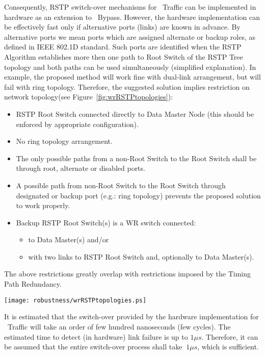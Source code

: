 Consequently, RSTP switch-over mechanisms for \HP\ Traffic can be
implemented in hardware as an extension to \HP\ Bypass. However, the hardware
implementation can be effectively fast only if alternative ports (links) are
known in advance. By alternative ports we mean ports which are assigned
alternate or backup roles, as defined in IEEE 802.1D standard\cite{IEEE8021D}.
Such ports are identified when the RSTP Algorithm establishes more then one path
to Root Switch of the RSTP Tree topology and both paths can be used
simultaneously (simplified explanation). In example, the proposed method will
work fine with dual-link arrangement, but will fail with ring topology.
Therefore, the suggested solution implies restriction on network topology(see
Figure~\ref{fig:wrRSTPtopologies}):
\begin{itemize}
  \item RSTP Root Switch connected directly to Data Master Node
(this should be enforced by appropriate configuration).
  \item No ring topology arrangement. 
  \item The only possible paths from a non-Root Switch to the Root Switch shall
be through root, alternate or disabled ports. 
  \item A possible path from non-Root Switch to the Root Switch through
designated or backup port (e.g.: ring topology) prevents the proposed solution
to work properly.
  \item Backup RSTP Root Switch(s) is a WR switch connected:
  \begin{itemize}
    \item to Data Master(s) and/or
    \item with two links to RSTP Root Switch and, optionally to Data
	  Master(s).
  \end{itemize} 
\end{itemize}
The above restrictions greatly overlap with restrictions imposed by the
Timing Path Redundancy.

\begin{center}
	\texttt{[image: robustness/wrRSTPtopologies.ps]}
	\label{fig:wrRSTPtopologies}
\end{center}

It is estimated that the switch-over provided by the hardware implementation
for \HP\ Traffic will take an order of few hundred nanoseconds (few cycles). The
estimated time to detect (in hardware) link failure is up to $1\mu s$.
Therefore, it can be assumed that the entire switch-over process shall take
$~1\mu s$, which is sufficient. 

